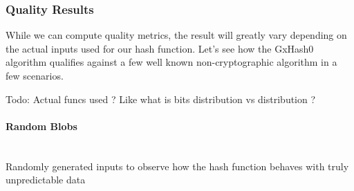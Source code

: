 \documentclass[10pt]{article}
\begin{document}
\subsubsection{Quality Results}

While we can compute quality metrics, the result will greatly vary depending on the actual inputs used for our hash function. Let's see how the GxHash0 algorithm qualifies against a few well known non-cryptographic algorithm in a few scenarios.

Todo: Actual funcs used ? Like what is bits distribution vs distribution ?

\clearpage
\paragraph{Random Blobs}\leavevmode\\
Randomly generated inputs to observe how the hash function behaves with truly unpredictable data
\end{document}
